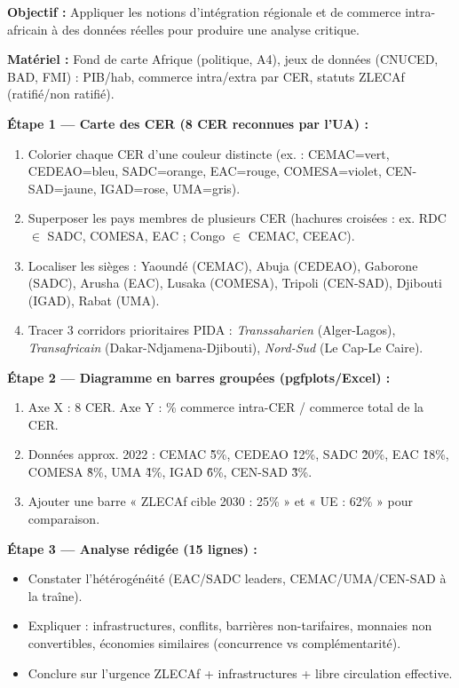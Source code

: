 \documentclass[11pt]{article}
\begin{document}
\begin{methode}
\textbf{Objectif :} Appliquer les notions d'intégration régionale et de commerce intra-africain à des données réelles pour produire une analyse critique.

\textbf{Matériel :} Fond de carte Afrique (politique, A4), jeux de données (CNUCED, BAD, FMI) : PIB/hab, commerce intra/extra par CER, statuts ZLECAf (ratifié/non ratifié).

\textbf{Étape 1 — Carte des CER (8 CER reconnues par l'UA) :}
\begin{enumerate}
    \item Colorier chaque CER d'une couleur distincte (ex. : CEMAC=vert, CEDEAO=bleu, SADC=orange, EAC=rouge, COMESA=violet, CEN-SAD=jaune, IGAD=rose, UMA=gris).
    \item Superposer les pays membres de plusieurs CER (hachures croisées : ex. RDC $\in$ SADC, COMESA, EAC ; Congo $\in$ CEMAC, CEEAC).
    \item Localiser les sièges : Yaoundé (CEMAC), Abuja (CEDEAO), Gaborone (SADC), Arusha (EAC), Lusaka (COMESA), Tripoli (CEN-SAD), Djibouti (IGAD), Rabat (UMA).
    \item Tracer 3 corridors prioritaires PIDA : \emph{Transsaharien} (Alger-Lagos), \emph{Transafricain} (Dakar-Ndjamena-Djibouti), \emph{Nord-Sud} (Le Cap-Le Caire).
\end{enumerate}

\textbf{Étape 2 — Diagramme en barres groupées (pgfplots/Excel) :}
\begin{enumerate}
    \item Axe X : 8 CER. Axe Y : \% commerce intra-CER / commerce total de la CER.
    \item Données approx. 2022 : CEMAC \~5\%, CEDEAO \~12\%, SADC \~20\%, EAC \~18\%, COMESA \~8\%, UMA \~4\%, IGAD \~6\%, CEN-SAD \~3\%.
    \item Ajouter une barre « ZLECAf cible 2030 : 25\% » et « UE : 62\% » pour comparaison.
\end{enumerate}

\textbf{Étape 3 — Analyse rédigée (15 lignes) :}
\begin{itemize}
    \item Constater l'hétérogénéité (EAC/SADC leaders, CEMAC/UMA/CEN-SAD à la traîne).
    \item Expliquer : infrastructures, conflits, barrières non-tarifaires, monnaies non convertibles, économies similaires (concurrence vs complémentarité).
    \item Conclure sur l'urgence ZLECAf + infrastructures + libre circulation effective.
\end{itemize}
\end{methode}
\end{document}
